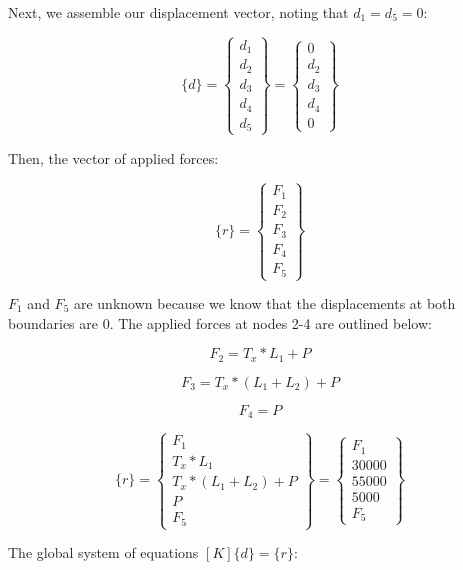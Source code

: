 \documentclass[../main.tex]{subfiles}
\begin{document}
Next, we assemble our displacement vector, noting that \(d_1 = d_5 = 0\):

\[
    \{d\} = 
    \begin{Bmatrix}
        d_1 \\ d_2 \\ d_3 \\d_4 \\d_5
    \end{Bmatrix}
    =
    \begin{Bmatrix}
        0 \\ d_2 \\ d_3 \\d_4 \\ 0
    \end{Bmatrix}
\]

Then, the vector of applied forces:

\[
    \{r\} = 
    \begin{Bmatrix}
        F_1 \\ F_2 \\ F_3 \\ F_4 \\ F_5
    \end{Bmatrix}
\]

\(F_1\) and \(F_5\) are unknown because we know that the displacements at both boundaries are 0.
The applied forces at nodes 2-4 are outlined below:

\[  
    F_2 = T_x * L_1 + P
\]

\[
    F_3 = T_x * (L_1 + L_2) + P
\]

\[
    F_4 = P
\]

\[
    \{r\} = 
    \begin{Bmatrix}
        F_1 \\ T_x * L_1 \\ T_x * (L_1 + L_2) + P \\ P \\ F_5
    \end{Bmatrix}
    =
    \begin{Bmatrix}
        F_1 \\ 30000 \\ 55000 \\ 5000 \\ F_5
    \end{Bmatrix}
\]

The global system of equations \([K]\{d\} = \{r\}\):
\end{document}
